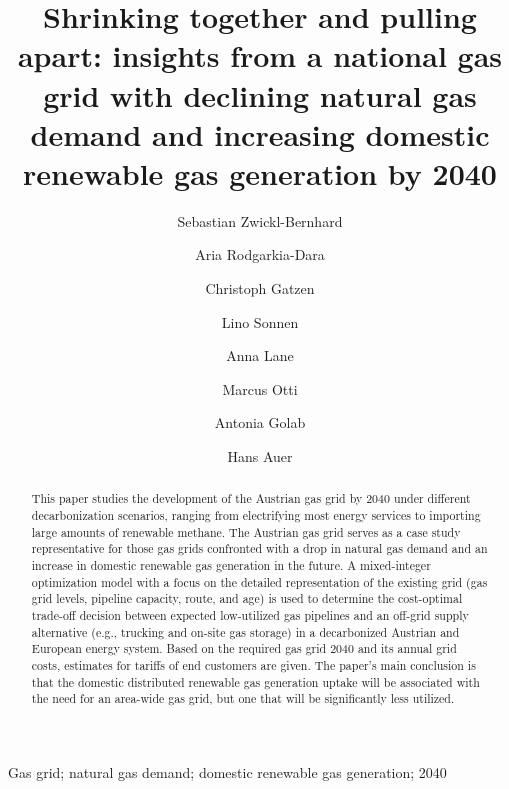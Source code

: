 \documentclass[review]{elsarticle}
\begin{document}
\begin{frontmatter}

\title{Shrinking together and pulling apart: insights from a national gas grid with declining natural gas demand and increasing domestic renewable gas generation by 2040}

\author[1,2]{Sebastian Zwickl-Bernhard}
\author[3]{Aria Rodgarkia-Dara}
\author[3]{Christoph Gatzen}
\author[3]{Lino Sonnen}
\author[3]{Anna Lane}
\author[1]{Marcus Otti}
\author[1]{Antonia Golab}
\author[1,2]{Hans Auer}
\address[1]{Energy Economics Group (EEG), Technische Universität Wien, Gusshausstrasse 25-29/E370-3, 1040 Wien, Austria}
\address[2]{Industrial Economics and Technology Management, Norwegian University of Science and Technology, Gløshaugen, Alfred Getz vei 3, Trondheim, 7491, Norway}
\address[3]{Frontier Economics Limited, Im Zollhafen 24, 50678 Köln, Deutschland}

\begin{abstract}
	This paper studies the development of the Austrian gas grid by 2040 under different decarbonization scenarios, ranging from electrifying most energy services to importing large amounts of renewable methane. The Austrian gas grid serves as a case study representative for those gas grids confronted with a drop in natural gas demand and an increase in domestic renewable gas generation in the future. A mixed-integer optimization model with a focus on the detailed representation of the existing grid (gas grid levels, pipeline capacity, route, and age) is used to determine the cost-optimal trade-off decision between expected low-utilized gas pipelines and an off-grid supply alternative (e.g., trucking and on-site gas storage) in a decarbonized Austrian and European energy system. Based on the required gas grid 2040 and its annual grid costs, estimates for tariffs of end customers are given. The paper's main conclusion is that the domestic distributed renewable gas generation uptake will be associated with the need for an area-wide gas grid, but one that will be significantly less utilized.
\end{abstract}

\begin{keyword}
	Gas grid; natural gas demand; domestic renewable gas generation; 2040

\end{keyword}
\end{frontmatter}

\newpage
\end{document}
